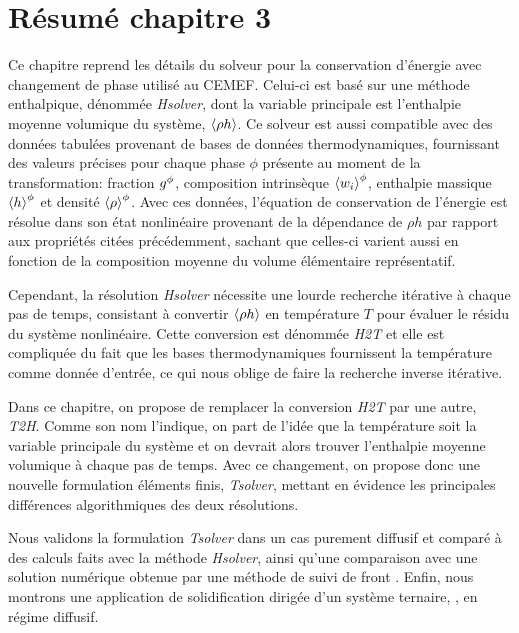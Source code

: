 \clearpage
\section*{Résumé chapitre 3}

Ce chapitre reprend les détails du solveur pour la conservation d'énergie avec changement de phase utilisé au CEMEF.
Celui-ci est basé sur une méthode enthalpique, dénommée \emph{Hsolver}, dont la variable principale est l'enthalpie
moyenne volumique du système, $\left \langle \rho h \right \rangle$. Ce solveur est aussi compatible avec des données tabulées provenant de bases de données
thermodynamiques, fournissant des valeurs précises pour chaque phase $\phi$ présente au moment de la transformation: 
fraction ${g^{\phi}} $, composition intrinsèque $\left \langle w_i \right \rangle^\phi$, enthalpie massique $\left \langle h \right \rangle^{\phi} $ et densité $\left \langle \rho \right \rangle^{\phi} $. 
Avec ces données, l'équation de conservation de l'énergie est résolue dans son état nonlinéaire 
provenant de la dépendance de $\rho h$ par rapport aux propriétés citées précédemment, sachant que celles-ci varient
aussi en fonction de la composition moyenne du volume élémentaire représentatif.


Cependant, la résolution \emph{Hsolver} nécessite une lourde recherche itérative à chaque pas de temps, consistant à convertir
$\left \langle \rho h \right \rangle$ en température $T$ pour évaluer le résidu du système nonlinéaire. Cette conversion est dénommée \emph{H2T} et elle est
compliquée du fait que les bases thermodynamiques fournissent la température comme donnée d'entrée, ce qui nous oblige de faire 
la recherche inverse itérative.


Dans ce chapitre, on propose de remplacer la conversion \emph{H2T} par une autre, \emph{T2H}. Comme son nom l'indique,
on part de l'idée que la température soit la variable principale du système et on devrait alors trouver l'enthalpie moyenne volumique
à chaque pas de temps. Avec ce changement, on propose donc une nouvelle formulation éléments finis, \emph{Tsolver}, mettant en évidence les principales
différences algorithmiques des deux résolutions.


Nous validons la formulation \emph{Tsolver} dans un cas purement diffusif et comparé à des calculs faits avec la méthode \emph{Hsolver}, 
ainsi qu'une comparaison avec une solution numérique obtenue par une méthode de suivi de front \citep{gandin_constrained_2000}.
Enfin, nous montrons une application de solidification dirigée d'un système ternaire, , en régime diffusif.

